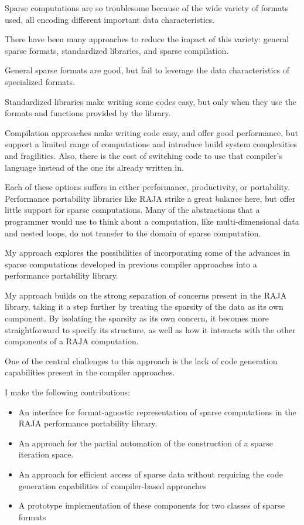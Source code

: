 Sparse computations are so troublesome because of the wide variety of formats used, all encoding different important data characteristics.

There have been many approaches to reduce the impact of this variety: general sparse formats, standardized libraries, and sparse compilation.

General sparse formats are good, but fail to leverage the data characteristics of specialized formats.

Standardized libraries make writing some codes easy, but only when they use the formats and functions provided by the library.

Compilation approaches make writing code easy, and offer good performance, but support a limited range of computations and introduce build system complexities and fragilities.
Also, there is the cost of switching code to use that compiler's language instead of the one its already written in.

Each of these options suffers in either performance, productivity, or portability.
Performance portability libraries like RAJA strike a great balance here, but offer little support for sparse computations.
Many of the abstractions that a programmer would use to think about a computation, like multi-dimensional data and nested loops, do not transfer to the domain of sparse computation.

My approach explores the possibilities of incorporating some of the advances in sparse computations developed in previous compiler approaches into a performance portability library.

My approach builds on the strong separation of concerns present in the RAJA library, taking it a step further by treating the sparsity of the data as its own component.
By isolating the sparsity as its own concern, it becomes more straightforward to specify its structure, as well as how it interacts with the other components of a RAJA computation.

One of the central challenges to this approach is the lack of code generation capabilities present in the compiler approaches.

I make the following contributions:
\begin{itemize}
\item An interface for format-agnostic representation of sparse computations in the RAJA performance portability library.
\item An approach for the partial automation of the construction of a sparse iteration space.
\item An approach for efficient access of sparse data without requiring the code generation capabilities of compiler-based approaches
\item A prototype implementation of these components for two classes of sparse formats
\end{itemize}

